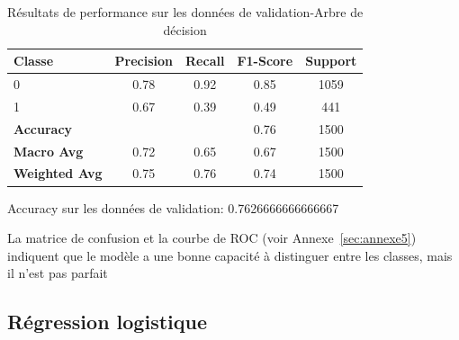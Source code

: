 \begin{table}[h]
\centering
\caption{Résultats de performance sur les données de validation-Arbre de décision}
\label{tab:performance_Arbre}
\begin{tabular}{|l|c|c|c|c|}
\hline
\textbf{Classe}     & \textbf{Precision} & \textbf{Recall} & \textbf{F1-Score} & \textbf{Support} \\ \hline
0                   & 0.78               & 0.92            & 0.85              & 1059             \\ \hline
1                   & 0.67               & 0.39            & 0.49              & 441              \\ \hline
\textbf{Accuracy}   & \multicolumn{2}{|c|}{} & 0.76 &  1500                              \\ \hline
\textbf{Macro Avg}  & 0.72               & 0.65            & 0.67              & 1500             \\ \hline
\textbf{Weighted Avg} & 0.75               & 0.76            & 0.74              & 1500             \\ \hline
\end{tabular}
\begin{flushleft}
Accuracy sur les données de validation: 0.7626666666666667
\end{flushleft}
\end{table}

\begin{flushleft}
La matrice de confusion et la courbe de ROC (voir Annexe~\ref{sec:annexe5}) indiquent que le modèle a une bonne capacité à distinguer entre les classes, mais il n'est pas parfait
\end{flushleft}

\subsection{Régression logistique}

